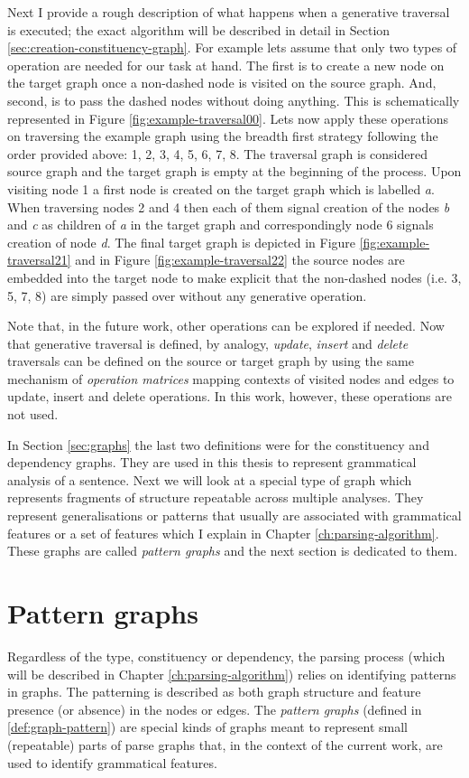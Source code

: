     Next I provide a rough description of what happens when a generative traversal is executed; the exact algorithm will be described in detail in Section \ref{sec:creation-constituency-graph}. For example lets assume that only two types of operation are needed for our task at hand. The first is to create a new node on the target graph once a non-dashed node is visited on the source graph. And, second, is to pass the dashed nodes without doing anything. This is schematically represented in Figure \ref{fig:example-traversal00}. Lets now apply these operations on traversing the example graph using the breadth first strategy following the order provided above: 1, 2, 3, 4, 5, 6, 7, 8. The traversal graph is considered source graph and the target graph is empty at the beginning of the process. Upon visiting node 1 a first node is created on the target graph which is labelled \textit{a}. When traversing nodes 2 and 4 then each of them signal creation of the nodes \textit{b} and \textit{c} as children of \textit{a} in the target graph and correspondingly node 6 signals creation of node \textit{d}. The final target graph is depicted in Figure \ref{fig:example-traversal21} and in Figure \ref{fig:example-traversal22} the source nodes are embedded into the target node to make explicit that the non-dashed nodes (i.e. 3, 5, 7, 8) are simply passed over without any generative operation. 

    Note that, in the future work, other operations can be explored if needed. Now that generative traversal is defined, by analogy, \textit{update}, \textit{insert} and \textit{delete} traversals can be defined on the source or target graph by using the same mechanism of \textit{operation matrices} mapping contexts of visited nodes and edges to update, insert and delete operations. In this work, however, these operations are not used.

    In Section \ref{sec:graphs} the last two definitions were for the constituency and dependency graphs. They are used in this thesis to represent grammatical analysis of a sentence. Next we will look at a special type of graph which represents fragments of structure repeatable across multiple analyses. They represent generalisations or patterns that usually are associated with grammatical features or a set of features which I explain in Chapter \ref{ch:parsing-algorithm}. These graphs are called \textit{pattern graphs} and the next section is dedicated to them.  

\section{Pattern graphs}
\label{sec:pattern-graphs}
    Regardless of the type, constituency or dependency, the parsing process (which will be described in Chapter \ref{ch:parsing-algorithm}) relies on identifying patterns in graphs. The patterning is described as both graph structure and feature presence (or absence) in the nodes or edges. The \textit{pattern graphs} (defined in \ref{def:graph-pattern}) are special kinds of graphs meant to represent small (repeatable) parts of parse graphs that, in the context of the current work, are used to identify grammatical features. 

